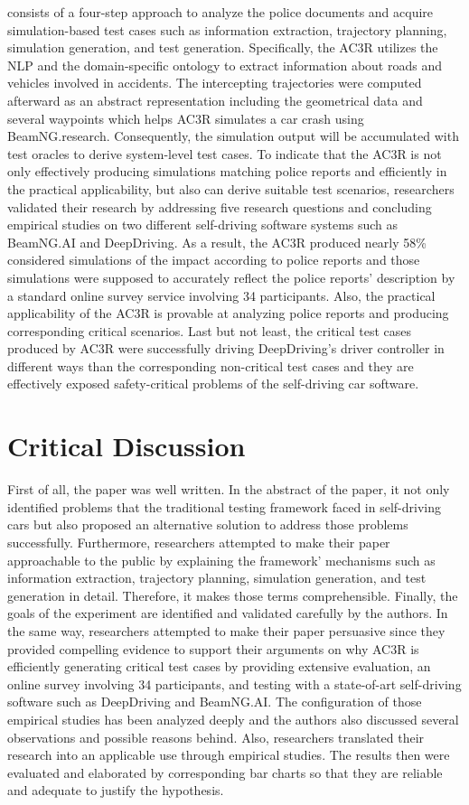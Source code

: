 \documentclass[10pt,a4paper]{report}
\begin{document}
%
consists of a four-step approach to analyze the police documents and acquire simulation-based test cases such as information extraction, trajectory planning, simulation generation, and test generation.
%
Specifically, the AC3R utilizes the NLP and the domain-specific ontology to extract information about roads and vehicles involved in accidents.
%
The intercepting trajectories were computed afterward as an abstract representation including the geometrical data and several waypoints which helps AC3R simulates a car crash using BeamNG.research.
%
Consequently, the simulation output will be accumulated with test oracles to derive system-level test cases.
%
To indicate that the AC3R is not only effectively producing simulations matching police reports and efficiently in the practical applicability, but also can derive suitable test scenarios, researchers validated their research by addressing five research questions and concluding empirical studies on two different self-driving software systems such as BeamNG.AI and DeepDriving.
%
As a result, the AC3R produced nearly 58\% considered simulations of the impact according to police reports and those simulations were supposed to accurately reflect the police reports' description by a standard online survey service involving 34 participants. 
%
Also, the practical applicability of the AC3R is provable at analyzing police reports and producing corresponding critical scenarios.
%
Last but not least, the critical test cases produced by AC3R were successfully driving DeepDriving’s driver controller in different ways than the corresponding non-critical test cases and they are effectively exposed safety-critical problems of the self-driving car software.

\section{Critical Discussion}
First of all, the paper was well written. In the abstract of the paper, it not only identified problems that the traditional testing framework faced in self-driving cars but also proposed an alternative solution to address those problems successfully. 
%
Furthermore, researchers attempted to make their paper approachable to the public by explaining the framework' mechanisms such as information extraction, trajectory planning, simulation generation, and test generation in detail. Therefore, it makes those terms comprehensible. 
%
Finally, the goals of the experiment are identified and validated carefully by the authors. 
%
In the same way, researchers attempted to make their paper persuasive since they provided compelling evidence to support their arguments on why AC3R is efficiently generating critical test cases by providing extensive evaluation, an online survey involving 34 participants, and testing with a state-of-art self-driving software such as DeepDriving and BeamNG.AI.
%
The configuration of those empirical studies has been analyzed deeply and the authors also discussed several observations and possible reasons behind.
%
Also, researchers translated their research into an applicable use through empirical studies. The results then were evaluated and elaborated by corresponding bar charts so that they are reliable and adequate to justify the hypothesis.
\end{document}
